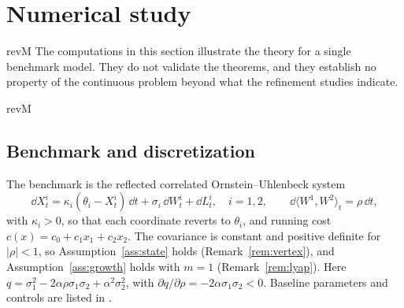 \section{Numerical study}\label{sec:numerics}

\begin{rv}{revM}{}
The computations in this section illustrate the theory for a
single benchmark model. They do not validate the theorems, and they
establish no property of the continuous problem beyond what the refinement studies indicate. 
\end{rv}

\begin{rv}{revM}{}
\subsection{Benchmark and discretization}

The benchmark is the reflected correlated Ornstein--Uhlenbeck system
\[
\dd X^i_t=\kappa_i(\theta_i-X^i_t)\,\dd t+\sigma_i\,\dd W^i_t+\dd L^i_t,\quad i=1,2,\qquad\dd\langle W^1,W^2\rangle_t=\rho\,\dd t,
\]
with $\kappa_i>0$, so that each coordinate reverts to $\theta_i$, and running cost
$c(x)=c_0+c_1x_1+c_2x_2$. The covariance is constant and positive definite for $|\rho|<1$, so
Assumption~\ref{ass:state} holds (Remark~\ref{rem:vertex}), and Assumption~\ref{ass:growth} holds with $m=1$
(Remark~\ref{rem:lyap}). Here $q=\sigma_1^2-2\alpha\rho\sigma_1\sigma_2+\alpha^2\sigma_2^2$, with
$\partial q/\partial\rho=-2\alpha\sigma_1\sigma_2<0$. Baseline parameters and controls are listed in
.


\end{rv}
